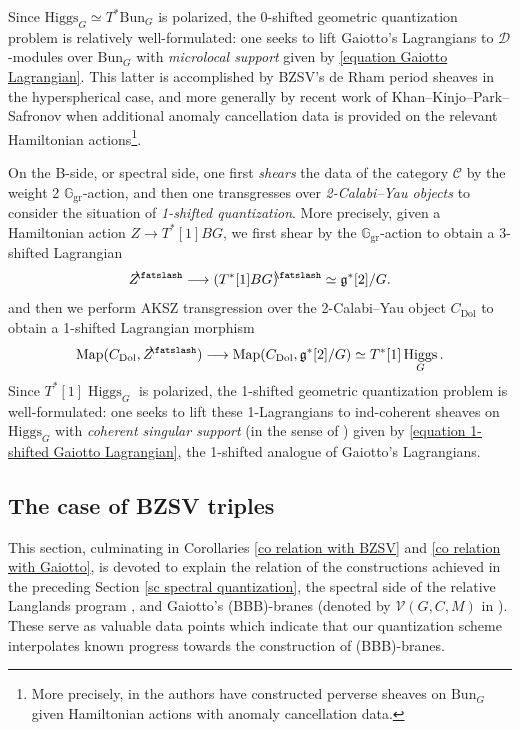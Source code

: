\documentclass[11pt, a4paper]{amsart}
\numberwithin{equation}{section}
\theoremstyle{definition}
\theoremstyle{remark}
\DeclareMathOperator{\Higgs}{Higgs}
\DeclareMathOperator{\Dol}{Dol}
\newcommand{\shear}{{\mathbin{\mkern-6mu\fatslash}}}
\newcommand{\Ggr}{\mathbb{G}_{\mathrm{gr}}}
\renewcommand{\to}{\longrightarrow}
\begin{document}
Since $\mathrm{Higgs}_G \simeq T^*\mathrm{Bun}_G$ is polarized, the 0-shifted geometric quantization problem is relatively well-formulated: one seeks to lift Gaiotto's Lagrangians to $\mathcal{D}$-modules over $\mathrm{Bun}_G$ with \textit{microlocal support} given by \eqref{equation Gaiotto Lagrangian}. This latter is accomplished by BZSV's de Rham period sheaves \cite{BZSV} in the hyperspherical case, and more generally by recent work of Khan--Kinjo--Park--Safronov \cite{KKPS} when additional anomaly cancellation data is provided on the relevant Hamiltonian actions\footnote{More precisely, in \cite{KKPS} the authors have constructed perverse sheaves on $\mathrm{Bun}_G$ given Hamiltonian actions with anomaly cancellation data.}. 

On the B-side, or spectral side, one first \textit{shears} the data of the category $\mathcal{C}$ by the weight 2 $\Ggr$-action, and then one transgresses over \textit{2-Calabi--Yau objects} to consider the situation of \textit{1-shifted quantization}. More precisely, given a Hamiltonian action $Z \to T^*[1]BG$, we first shear by the $\Ggr$-action to obtain a 3-shifted Lagrangian
$$Z^\shear \longrightarrow (T^*[1]BG)^\shear \simeq \mathfrak{g}^*[2]/G.$$
and then we perform AKSZ transgression over the 2-Calabi--Yau object $C_{\Dol}$ to obtain a 1-shifted Lagrangian morphism
\begin{equation}\label{equation 1-shifted Gaiotto Lagrangian}
    \mathrm{Map}(C_{\Dol}, Z^\shear) \longrightarrow \mathrm{Map}(C_{\Dol}, \mathfrak{g}^*[2]/G) \simeq T^*[1]\Higgs_G.
\end{equation}
Since $T^*[1]\Higgs_G$ is polarized, the 1-shifted geometric quantization problem is well-formulated: one seeks to lift these 1-Lagrangians to ind-coherent sheaves on $\mathrm{Higgs}_G$ with \textit{coherent singular support} (in the sense of \cite{arinkin&gaitsgory}) given by \eqref{equation 1-shifted Gaiotto Lagrangian}, the 1-shifted analogue of Gaiotto's Lagrangians. 



\subsection{The case of BZSV triples}
\label{sc BZSV}

This section, culminating in Corollaries \ref{co relation with BZSV} and \ref{co relation with Gaiotto}, is devoted to explain the relation of the constructions achieved in the preceding Section \ref{sc spectral quantization}, the spectral side of the relative Langlands program \cite{BZSV}, and Gaiotto's (BBB)-branes (denoted by $\mathcal{V}(G,C,M)$ in \cite{Gaiotto}). These serve as valuable data points which indicate that our quantization scheme interpolates known progress towards the construction of (BBB)-branes. 
\end{document}
